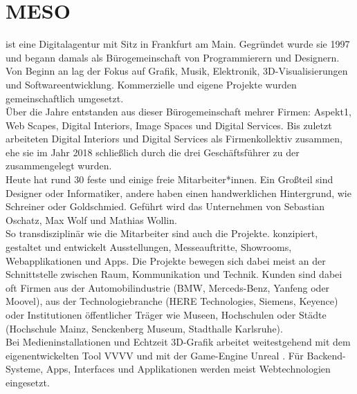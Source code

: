 \section{MESO}
\label{sec:meso}

\mesoFull{} ist eine Digitalagentur mit Sitz in Frankfurt am Main.
Gegründet wurde sie 1997 und begann damals als Bürogemeinschaft von Programmierern
und Designern. Von Beginn an lag der Fokus auf Grafik, Musik, Elektronik, 3D-Visualisierungen
und Softwareentwicklung. Kommerzielle und eigene Projekte wurden gemeinschaftlich
umgesetzt.\\

Über die Jahre entstanden aus dieser Bürogemeinschaft mehrer Firmen: Aspekt1, \meso{} Web Scapes, \meso{}
Digital Interiors, \meso{} Image Spaces und \meso{} Digital Services. Bis zuletzt arbeiteten 
\meso{} Digital Interiors und \meso{} Digital Services als Firmenkollektiv zusammen, 
ehe sie im Jahr 2018 schließlich durch die drei Geschäftsführer zu der \mesoFull{} zusammengelegt
wurden.\\
Heute hat \meso{} rund 30 feste und einige freie Mitarbeiter*innen. Ein Großteil sind Designer oder Informatiker, 
andere haben einen handwerklichen Hintergrund, wie Schreiner oder Goldschmied. 
Geführt wird das Unternehmen von Sebastian Oschatz, Max Wolf und Mathias Wollin.\\
So transdisziplinär wie die Mitarbeiter sind auch die Projekte. \meso{} konzipiert, gestaltet und entwickelt
Ausstellungen, Messeauftritte, Showrooms, Webapplikationen und Apps. Die Projekte bewegen sich dabei meist an der
Schnittstelle zwischen Raum, Kommunikation und Technik. Kunden sind dabei oft Firmen aus der
Automobilindustrie (BMW, Merceds-Benz, Yanfeng oder Moovel), aus der Technologiebranche (HERE Technologies,
Siemens, Keyence) oder Institutionen öffentlicher Träger wie Museen, Hochschulen oder Städte (Hochschule Mainz,
Senckenberg Museum, Stadthalle Karlsruhe).\\

Bei Medieninstallationen und Echtzeit 3D-Grafik arbeitet \meso{} weitestgehend mit dem eigenentwickelten 
Tool VVVV \cite{vvvv} und mit der Game-Engine Unreal \cite{unreal}. Für Backend-Systeme, Apps, Interfaces
und Applikationen werden meist Webtechnologien eingesetzt.
